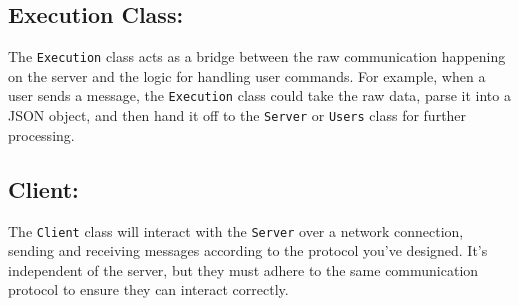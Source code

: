 \documentclass{article}
\begin{document}
\subsection*{Execution Class:}
The \texttt{Execution} class acts as a bridge between the raw communication happening on the server and the logic for handling user commands. For example, when a user sends a message, the \texttt{Execution} class could take the raw data, parse it into a JSON object, and then hand it off to the \texttt{Server} or \texttt{Users} class for further processing.

\subsection*{Client:}
The \texttt{Client} class will interact with the \texttt{Server} over a network connection, sending and receiving messages according to the protocol you've designed. It’s independent of the server, but they must adhere to the same communication protocol to ensure they can interact correctly.
\end{document}
